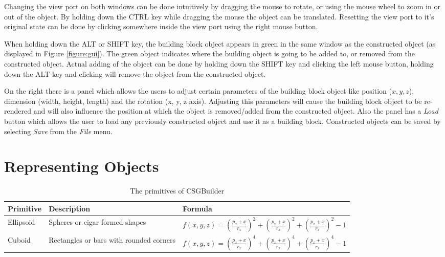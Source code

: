 \documentclass[a4paper,10pt,twocolumn]{article}
\begin{document}
Changing the view port on both windows can be done intuitively by dragging the mouse to rotate, or using the mouse wheel to zoom in or out of the object. By holding down the CTRL key while dragging the mouse the object can be translated. Resetting the view port to it's original state can be done by clicking somewhere inside the view port using the right mouse button.

When holding down the ALT or SHIFT key, the building block object appears in green in the same window as the constructed object (as displayed in Figure \ref{figure:gui}). The green object indicates where the building object is going to be added to, or removed from the constructed object. Actual adding of the object can be done by holding down the SHIFT key and clicking the left mouse button, holding down the ALT key and clicking will remove the object from the constructed object.

On the right there is a panel which allows the users to adjust certain parameters of the building block object like position ($x, y, z$), dimension (width, height, length) and the rotation (x, y, z axis). Adjusting this parameters will cause the building block object to be re-rendered and will also influence the position at which the object is removed/added from the constructed object. Also the panel has a \textit{Load} button which allows the user to load any previously constructed object and use it as a building block. Constructed objects can be saved by selecting \textit{Save} from the \textit{File} menu.

\section{Representing Objects}
\label{chapt:repobj}


    \begin{table}[t!]
        \begin{tabular}{|p{.1\linewidth}|p{.41\linewidth}|p{.40\linewidth}|}
            \hline
            \textbf{Primitive} & \textbf{Description} & \textbf{Formula}\\
            \hline
            \hline
             \vspace{0.1em}
             Ellipsoid &
             \vspace{0.1em}
             Spheres or cigar formed shapes &
             \vspace{0.1em}
             $f(x,y,z)=(\frac{p_x + x}{r_x})^2+(\frac{p_x + x}{r_x})^2+(\frac{p_x + x}{r_x})^2 - 1$\\[1.2em]
            \hline
             \vspace{0.1em}
             Cuboid &
             \vspace{0.1em}
             Rectangles or bars with rounded corners &
             \vspace{0.1em}
             $f(x,y,z)=(\frac{p_x + x}{r_x})^4+(\frac{p_x + x}{r_x})^4+(\frac{p_x + x}{r_x})^4 - 1$\\[1.2em]
            \hline
        \end{tabular}
        \caption{The primitives of CSGBuilder}
        \label{table:primitives}
    \end{table}
    
\end{document}
